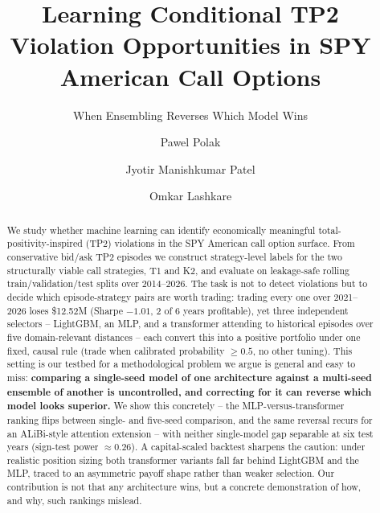\documentclass[sigconf,review]{acmart}
\begin{document}
\title{Learning Conditional TP2 Violation Opportunities in SPY American Call Options}
\subtitle{When Ensembling Reverses Which Model Wins}

\author{Pawel Polak}

\author{Jyotir Manishkumar Patel}

\author{Omkar Lashkare}

\renewcommand{\shortauthors}{Polak, Patel, Lashkare}

\begin{abstract}
We study whether machine learning can identify economically meaningful total-positivity-inspired (TP2) violations in the SPY American call option surface. From conservative bid/ask TP2 episodes we construct strategy-level labels for the two structurally viable call strategies, T1 and K2, and evaluate on leakage-safe rolling train/validation/test splits over 2014--2026. The task is not to detect violations but to decide which episode-strategy pairs are worth trading: trading every one over 2021--2026 loses \$12.52M (Sharpe $-1.01$, 2 of 6 years profitable), yet three independent selectors -- LightGBM, an MLP, and a transformer attending to historical episodes over five domain-relevant distances -- each convert this into a positive portfolio under one fixed, causal rule (trade when calibrated probability $\ge 0.5$, no other tuning). This setting is our testbed for a methodological problem we argue is general and easy to miss: \textbf{comparing a single-seed model of one architecture against a multi-seed ensemble of another is uncontrolled, and correcting for it can reverse which model looks superior.} We show this concretely -- the MLP-versus-transformer ranking flips between single- and five-seed comparison, and the same reversal recurs for an ALiBi-style attention extension -- with neither single-model gap separable at six test years (sign-test power $\approx0.26$). A capital-scaled backtest sharpens the caution: under realistic position sizing both transformer variants fall far behind LightGBM and the MLP, traced to an asymmetric payoff shape rather than weaker selection. Our contribution is not that any architecture wins, but a concrete demonstration of how, and why, such rankings mislead.
\end{abstract}
\end{document}
